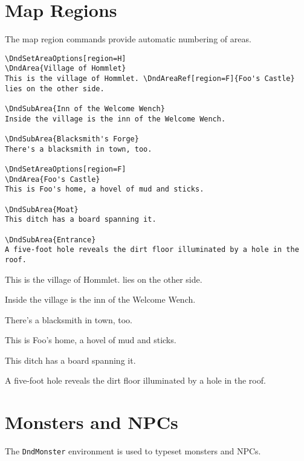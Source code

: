 \documentclass[letterpaper,10pt,twoside,twocolumn,openany]{dndbook}
\begin{document}
\section{Map Regions}
The map region commands provide automatic numbering of areas.

\begin{lstlisting}
\DndSetAreaOptions[region=H]
\DndArea{Village of Hommlet}
This is the village of Hommlet. \DndAreaRef[region=F]{Foo's Castle} lies on the other side.

\DndSubArea{Inn of the Welcome Wench}
Inside the village is the inn of the Welcome Wench.

\DndSubArea{Blacksmith's Forge}
There's a blacksmith in town, too.

\DndSetAreaOptions[region=F]
\DndArea{Foo's Castle}
This is Foo's home, a hovel of mud and sticks.

\DndSubArea{Moat}
This ditch has a board spanning it.

\DndSubArea{Entrance}
A five-foot hole reveals the dirt floor illuminated by a hole in the roof.
\end{lstlisting}

\DndSetAreaOptions[region=H]
This is the village of Hommlet.  lies on the other side.

Inside the village is the inn of the Welcome Wench.

There's a blacksmith in town, too.

\DndSetAreaOptions[region=F]
This is Foo's home, a hovel of mud and sticks.

This ditch has a board spanning it.

A five-foot hole reveals the dirt floor illuminated by a hole in the roof.

\newpage

\section{Monsters and NPCs}
The \lstinline!DndMonster! environment is used to typeset monsters and NPCs.
\end{document}
